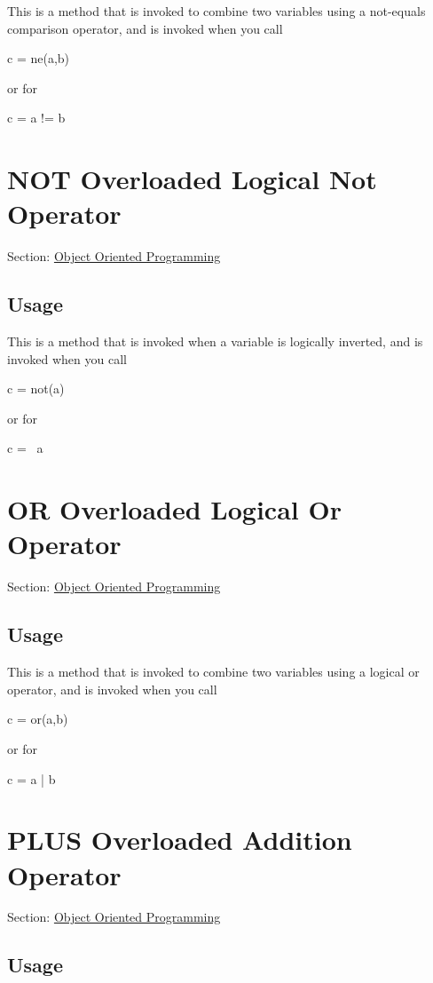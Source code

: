 This is a method that is invoked to combine two variables using a not-\/equals comparison operator, and is invoked when you call \begin{DoxyVerb}   c = ne(a,b)
\end{DoxyVerb}
 or for \begin{DoxyVerb}   c = a != b
\end{DoxyVerb}
 \hypertarget{class_not}{}\section{N\-O\-T Overloaded Logical Not Operator}\label{class_not}
Section\-: \hyperlink{sec_class}{Object Oriented Programming} \hypertarget{vtkwidgets_vtkxyplotwidget_Usage}{}\subsection{Usage}\label{vtkwidgets_vtkxyplotwidget_Usage}
This is a method that is invoked when a variable is logically inverted, and is invoked when you call \begin{DoxyVerb}   c = not(a)
\end{DoxyVerb}
 or for \begin{DoxyVerb}   c = ~a
\end{DoxyVerb}
 \hypertarget{class_or}{}\section{O\-R Overloaded Logical Or Operator}\label{class_or}
Section\-: \hyperlink{sec_class}{Object Oriented Programming} \hypertarget{vtkwidgets_vtkxyplotwidget_Usage}{}\subsection{Usage}\label{vtkwidgets_vtkxyplotwidget_Usage}
This is a method that is invoked to combine two variables using a logical or operator, and is invoked when you call \begin{DoxyVerb}   c = or(a,b)
\end{DoxyVerb}
 or for \begin{DoxyVerb}   c = a | b
\end{DoxyVerb}
 \hypertarget{class_plus}{}\section{P\-L\-U\-S Overloaded Addition Operator}\label{class_plus}
Section\-: \hyperlink{sec_class}{Object Oriented Programming} \hypertarget{vtkwidgets_vtkxyplotwidget_Usage}{}\subsection{Usage}\label{vtkwidgets_vtkxyplotwidget_Usage}
